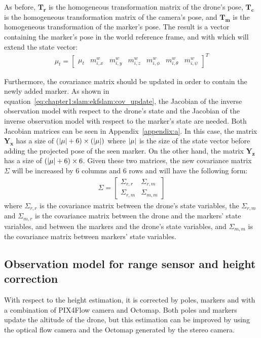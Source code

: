 As before, $\bm{T_r}$ is the homogeneous transformation matrix of the drone's pose, $\bm{T_c}$ is the homogeneous transformation matrix of the camera's pose, and $\bm{T_m}$ is the homogeneous transformation of the marker's pose. The result is a vector containing the marker's pose in the world reference frame, and with which will extend the state vector:
\begin{align*}
    \mu_t = \left[\begin{array}{c|cccccc}
        \mu_t & m_{i, x}^w & m_{i, y}^w & m_{i, z}^w & m_{i, \phi}^w & m_{i, \theta}^w & m_{i, \psi}^w
    \end{array}
    \right]^T
\end{align*}

Furthermore, the covariance matrix should be updated in order to contain the newly added marker. As shown in equation~\ref{eq:chapter1:slam:ekfslam:cov_update}, the Jacobian of the inverse observation model with respect to the drone's state and the Jacobian of the inverse observation model with respect to the marker's state are needed. Both Jacobian matrices can be seen in Appendix~\ref{appendix:a}. In this case, the matrix $\bm{Y_x}$ has a size of ($\lvert \mu \rvert+6) \times (\lvert \mu \rvert)$ where $\lvert \mu \rvert$ is the size of the state vector before adding the projected pose of the seen marker. On the other hand, the matrix $\bm{Y_z}$ has a size of $(\lvert \mu \rvert+6) \times 6$. Given these two matrices, the new covariance matrix $\Sigma$ will be increased by 6 columns and 6 rows and will have the following form:
\begin{align*}
    \Sigma = \begin{bmatrix}
        \Sigma_{r,r} & \Sigma_{r,m} \\ \Sigma_{r,m} & \Sigma_{m,m}
    \end{bmatrix}
\end{align*}
where $\Sigma_{r,r}$ is the covariance matrix between the drone's state variables, the $\Sigma_{r,m}$ and $\Sigma_{m,r}$ is the covariance matrix between the drone and the markers' state variables, and between the markers and the drone's state variables, and $\Sigma_{m,m}$ is the covariance matrix between markers' state variables.

\subsection{Observation model for range sensor and height correction}
\label{subsec:chapter2:correction:range}
With respect to the height estimation, it is corrected by poles, markers and with a combination of PIX4Flow camera and Octomap. Both poles and markers update the altitude of the drone, but this estimation can be improved by using the optical flow camera and the Octomap generated by the stereo camera.\\

